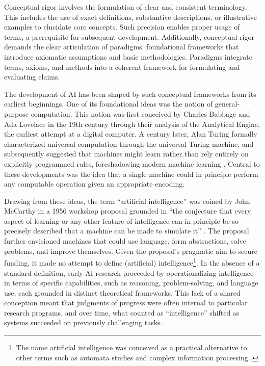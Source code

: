 \documentclass{article}
\begin{document}
Conceptual rigor involves the formulation of clear and consistent terminology.
This includes the use of exact definitions, substantive descriptions, or illustrative examples to elucidate core concepts.
Such precision enables proper usage of terms, a prerequisite for subsequent development.
Additionally, conceptual rigor demands the clear articulation of paradigms: foundational frameworks that introduce axiomatic assumptions and basic methodologies.
Paradigms integrate terms, axioms, and methods into a coherent framework for formulating and evaluating claims.

The development of AI has been shaped by such conceptual frameworks from its earliest beginnings.
One of its foundational ideas was the notion of general-purpose computation.
This notion was first conceived by Charles Babbage and Ada Lovelace in the 19th century through their analysis of the Analytical Engine, the earliest attempt at a digital computer.
A century later, Alan Turing formally characterized universal computation through the universal Turing machine, and subsequently suggested that machines might learn rather than rely entirely on explicitly programmed rules, foreshadowing modern machine learning \cite{Turing1950Computing}.
Central to these developments was the idea that a single machine could in principle perform any computable operation given an appropriate encoding.

Drawing from these ideas, the term ``artificial intelligence'' was coined by John McCarthy in a 1956 workshop proposal grounded in ``the conjecture that every aspect of learning or any other feature of intelligence can in principle be so precisely described that a machine can be made to simulate it'' \cite{McCarthy1955Dartmouth}.
The proposal further envisioned machines that could use language, form abstractions, solve problems, and improve themselves.
Given the proposal’s pragmatic aim to secure funding, it made no attempt to define (artificial) intelligence\footnote{The name artificial intelligence was conceived as a practical alternative to other terms such as automata studies and complex information processing \cite{FloridiNobre2024}.}.
In the absence of a standard definition, early AI research proceeded by operationalizing intelligence in terms of specific capabilities, such as reasoning, problem-solving, and language use, each grounded in distinct theoretical frameworks.
This lack of a shared conception meant that judgments of progress were often internal to particular research programs, and over time, what counted as ``intelligence'' shifted as systems succeeded on previously challenging tasks.
\end{document}

